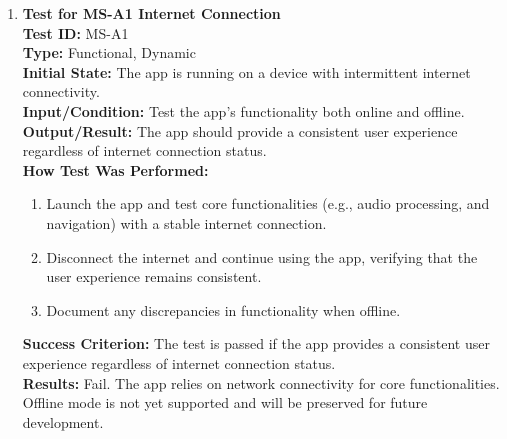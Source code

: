 \documentclass[12pt, titlepage]{article}
\begin{document}
\begin{enumerate}
    \item \textbf{Test for MS-A1 Internet Connection} \\
      \newline
      \textbf{Test ID:} MS-A1 \\
      \textbf{Type:} Functional, Dynamic \\
      \textbf{Initial State:} The app is running on a device with intermittent internet connectivity. \\
      \textbf{Input/Condition:} Test the app’s functionality both online and offline. \\
      \textbf{Output/Result:} The app should provide a consistent user experience regardless of internet connection status. \\
      \textbf{How Test Was Performed:}
      \begin{enumerate}
          \item Launch the app and test core functionalities (e.g., audio processing, and navigation) with a stable internet connection.
          \item Disconnect the internet and continue using the app, verifying that the user experience remains consistent.
          \item Document any discrepancies in functionality when offline.
      \end{enumerate}
      \textbf{Success Criterion:} The test is passed if the app provides a consistent user experience regardless of internet connection status.\\
      \textbf{Results:} Fail. The app relies on network connectivity for core functionalities. Offline mode is not yet supported and will be preserved for future development.\\


\end{enumerate}
\end{document}
